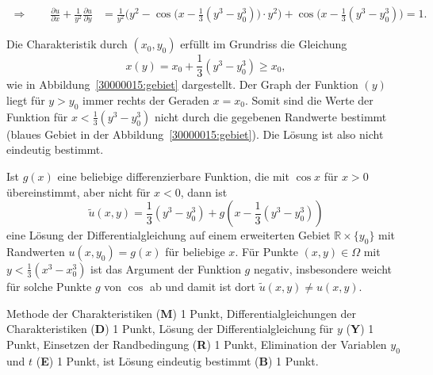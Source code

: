 \begin{loesung}
\begin{teilaufgaben}
\begin{align*}
\Rightarrow
\qquad
\frac{\partial u}{\partial x}
+
\frac1{y^2}
\frac{\partial u}{\partial y}
&=
\frac1{y^2}\biggl(y^2 -
\cos\bigl(x-{\textstyle\frac13}(y^3-y_0^3)\bigr)
\cdot y^2\biggr)
+
\cos\bigl(x-{\textstyle\frac13}(y^3-y_0^3)\bigr)
=1.
\end{align*}
\item
Die Charakteristik durch $(x_0,y_0)$ erfüllt im Grundriss die Gleichung
\[
x(y)
=
x_0 + {\textstyle\frac13}(y^3-y_0^3)
\ge
x_0,
\]
wie in Abbildung~\ref{30000015:gebiet} dargestellt.
Der Graph der Funktion $(y)$ liegt für $y>y_0$ immer rechts der
Geraden $x=x_0$.
Somit sind die Werte der Funktion für $x < {\textstyle\frac13}(y^3-y_0^3)$
nicht durch die gegebenen Randwerte bestimmt (blaues Gebiet in der
Abbildung~\ref{30000015:gebiet}).
Die Lösung ist also nicht eindeutig bestimmt.
\qedhere
\end{teilaufgaben}
\end{loesung}

\begin{diskussion}
Ist $g(x)$ eine beliebige differenzierbare Funktion, die mit $\cos x$ 
für $x>0$ übereinstimmt, aber nicht für $x<0$, dann ist
\[
\tilde u(x,y) = {\textstyle\frac13}(y^3-y_0^3) + g(x-{\textstyle\frac13}(y^3-y_0^3))
\]
eine Lösung der Differentialgleichung auf einem erweiterten Gebiet
$\mathbb R \times \{y_0\}$ mit Randwerten $u(x, y_0)=g(x)$ für beliebige $x$.
Für Punkte $(x,y)\in\Omega$ mit $y<{\textstyle\frac13}(x^3-x_0^3)$
ist das Argument
der Funktion $g$ negativ, insbesondere weicht für solche Punkte $g$ von
$\cos$ ab und damit ist dort $\tilde u(x,y)\ne u(x,y)$.
\end{diskussion}

\begin{bewertung}
Methode der Charakteristiken ({\bf M}) 1 Punkt,
Differentialgleichungen der Charakteristiken ({\bf D}) 1 Punkt,
Lösung der Differentialgleichung für $y$ ({\bf Y}) 1 Punkt,
Einsetzen der Randbedingung ({\bf R}) 1 Punkt,
Elimination der Variablen $y_0$ und $t$ ({\bf E}) 1 Punkt,
ist Lösung eindeutig bestimmt ({\bf B}) 1 Punkt.
\end{bewertung}



